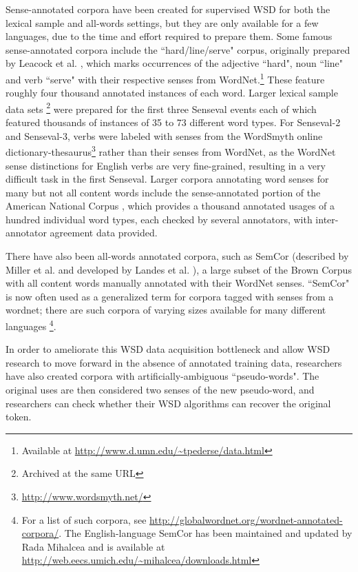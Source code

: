 Sense-annotated corpora have been created for supervised WSD for both the
lexical sample and all-words settings, but they are only available for a few
languages, due to the time and effort required to prepare them.  Some famous
sense-annotated corpora include the ``hard/line/serve" corpus, originally
prepared by Leacock et al.
\cite{Leacock:1993:CSS:1075671.1075730,leacock1998using}, which
marks occurrences of the adjective ``hard", noun ``line" and verb ``serve" with
their respective senses from WordNet.\footnote{Available at
\url{http://www.d.umn.edu/~tpederse/data.html}}
These feature roughly four thousand annotated instances of each word. Larger
lexical sample data sets \footnote{Archived at the same URL} 
were prepared for the first three Senseval events
\cite{Kilgarriff98senseval,
      edmonds-cotton:2001:SENSEVAL,
      mihalcea-chklovski-kilgarriff:2004:Senseval-3}
each of which featured thousands of instances of 35 to 73 different
word types. For Senseval-2 and Senseval-3, verbs were labeled with senses from
the WordSmyth online
dictionary-thesaurus\footnote{\url{http://www.wordsmyth.net/}} rather than
their senses from WordNet, as the WordNet sense distinctions for English verbs
are very fine-grained, resulting in a very difficult task in the first
Senseval.
Larger corpora annotating word senses for many but not all content words
include the sense-annotated portion of the American National Corpus
\cite{passonneau2012masc}, which provides a thousand annotated usages of a
hundred individual word types, each checked by several annotators, with
inter-annotator agreement data provided.

There have also been all-words annotated corpora,
such as SemCor (described by Miller et al.
\cite{Miller:1993:SC:1075671.1075742} and developed by Landes et al.
\cite{landes1998}), a large subset of the Brown Corpus with all
content words manually annotated with their WordNet senses. ``SemCor" is now
often used as a generalized term for corpora tagged with senses from a wordnet;
there are such corpora of varying sizes available for many different
languages \footnote{For a list of such corpora, see
\url{http://globalwordnet.org/wordnet-annotated-corpora/}.
The English-language SemCor has been maintained and updated by Rada Mihalcea
and is available at \url{http://web.eecs.umich.edu/~mihalcea/downloads.html}}.

In order to ameliorate this WSD data acquisition bottleneck and allow WSD
research to move forward in the absence of annotated training data, researchers
have also created corpora with artificially-ambiguous ``pseudo-words".  The
original uses are then considered two senses of the new pseudo-word, and
researchers can check whether their WSD algorithms can recover the original
token.

